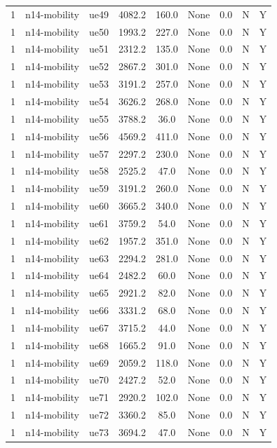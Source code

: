 \begin{table}[ht]
\begin{tabular}{|c|c|c|c|c|c|c|c|c|}
1 & n14-mobility & ue49 & 4082.2 & 160.0 & None & 0.0 & N & Y \\
1 & n14-mobility & ue50 & 1993.2 & 227.0 & None & 0.0 & N & Y \\
1 & n14-mobility & ue51 & 2312.2 & 135.0 & None & 0.0 & N & Y \\
1 & n14-mobility & ue52 & 2867.2 & 301.0 & None & 0.0 & N & Y \\
1 & n14-mobility & ue53 & 3191.2 & 257.0 & None & 0.0 & N & Y \\
1 & n14-mobility & ue54 & 3626.2 & 268.0 & None & 0.0 & N & Y \\
1 & n14-mobility & ue55 & 3788.2 & 36.0 & None & 0.0 & N & Y \\
1 & n14-mobility & ue56 & 4569.2 & 411.0 & None & 0.0 & N & Y \\
1 & n14-mobility & ue57 & 2297.2 & 230.0 & None & 0.0 & N & Y \\
1 & n14-mobility & ue58 & 2525.2 & 47.0 & None & 0.0 & N & Y \\
1 & n14-mobility & ue59 & 3191.2 & 260.0 & None & 0.0 & N & Y \\
1 & n14-mobility & ue60 & 3665.2 & 340.0 & None & 0.0 & N & Y \\
1 & n14-mobility & ue61 & 3759.2 & 54.0 & None & 0.0 & N & Y \\
1 & n14-mobility & ue62 & 1957.2 & 351.0 & None & 0.0 & N & Y \\
1 & n14-mobility & ue63 & 2294.2 & 281.0 & None & 0.0 & N & Y \\
1 & n14-mobility & ue64 & 2482.2 & 60.0 & None & 0.0 & N & Y \\
1 & n14-mobility & ue65 & 2921.2 & 82.0 & None & 0.0 & N & Y \\
1 & n14-mobility & ue66 & 3331.2 & 68.0 & None & 0.0 & N & Y \\
1 & n14-mobility & ue67 & 3715.2 & 44.0 & None & 0.0 & N & Y \\
1 & n14-mobility & ue68 & 1665.2 & 91.0 & None & 0.0 & N & Y \\
1 & n14-mobility & ue69 & 2059.2 & 118.0 & None & 0.0 & N & Y \\
1 & n14-mobility & ue70 & 2427.2 & 52.0 & None & 0.0 & N & Y \\
1 & n14-mobility & ue71 & 2920.2 & 102.0 & None & 0.0 & N & Y \\
1 & n14-mobility & ue72 & 3360.2 & 85.0 & None & 0.0 & N & Y \\
1 & n14-mobility & ue73 & 3694.2 & 47.0 & None & 0.0 & N & Y \\

\end{tabular}
\end{table}
